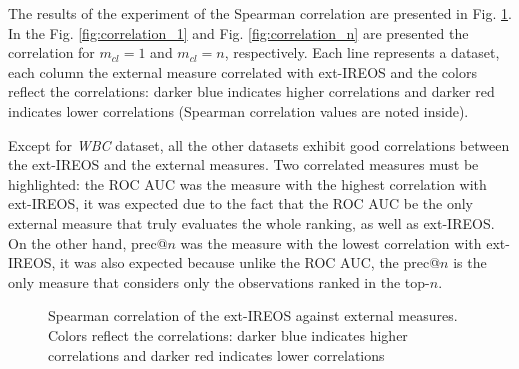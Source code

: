 The results of the experiment of the Spearman correlation are presented in Fig. \ref{fig:correlation}. In the Fig. \ref{fig:correlation_1} and Fig. \ref{fig:correlation_n} are presented the correlation for $m_{cl} = 1$ and $m_{cl} = n$, respectively. Each line represents a dataset, each column the external measure correlated with ext-IREOS and the colors reflect the correlations: darker blue indicates higher correlations and darker red indicates lower correlations (Spearman correlation values are noted inside).  

Except for \textit{WBC} dataset, all the other datasets exhibit good correlations between the ext-IREOS and the external measures. Two correlated measures must be highlighted: the ROC AUC was the measure with the highest correlation with ext-IREOS, it was expected due to the fact that the ROC AUC be the only external measure that truly evaluates the whole ranking, as well as ext-IREOS. On the other hand, prec@$n$ was the measure with the lowest correlation with ext-IREOS, it was also expected because unlike the ROC AUC, the prec@$n$ is the only measure that considers only the observations ranked in the top-$n$.

\begin{figure}[ht!]
\center
\captionsetup{justification=centering}
\caption{Spearman correlation of the ext-IREOS against external measures. \\ Colors reflect the correlations: darker blue indicates higher correlations and darker red indicates lower correlations}
\label{fig:correlation}
\end{figure}


